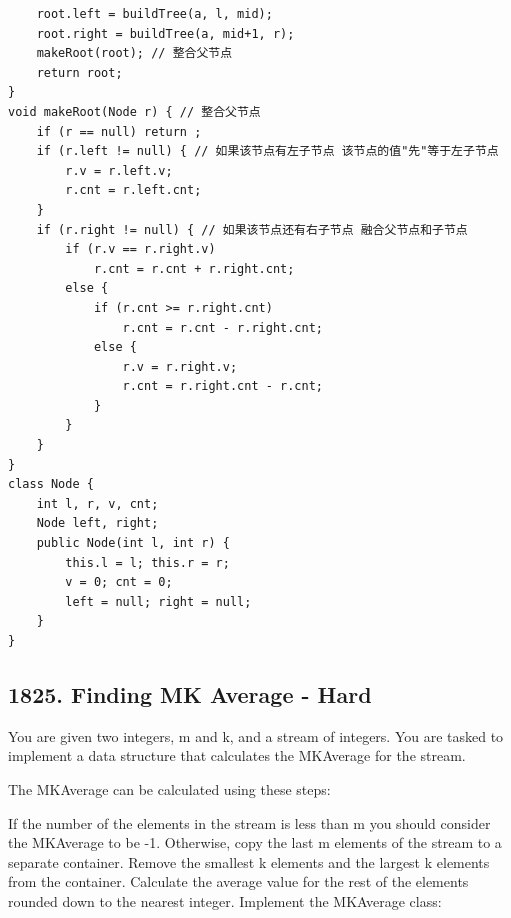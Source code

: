 \documentclass[9pt, b5paaper]{book}
\begin{document}
\begin{verbatim}
    root.left = buildTree(a, l, mid);
    root.right = buildTree(a, mid+1, r);
    makeRoot(root); // 整合父节点
    return root;
}
void makeRoot(Node r) { // 整合父节点
    if (r == null) return ;
    if (r.left != null) { // 如果该节点有左子节点 该节点的值"先"等于左子节点
        r.v = r.left.v;
        r.cnt = r.left.cnt;
    }
    if (r.right != null) { // 如果该节点还有右子节点 融合父节点和子节点
        if (r.v == r.right.v)
            r.cnt = r.cnt + r.right.cnt;
        else {
            if (r.cnt >= r.right.cnt)
                r.cnt = r.cnt - r.right.cnt;
            else {
                r.v = r.right.v;
                r.cnt = r.right.cnt - r.cnt;
            }
        }
    }
}
class Node {
    int l, r, v, cnt;
    Node left, right;
    public Node(int l, int r) {
        this.l = l; this.r = r;
        v = 0; cnt = 0;
        left = null; right = null;
    }
}
\end{verbatim}
\subsection{1825. Finding MK Average - Hard}
\label{sec-1-1-3}
You are given two integers, m and k, and a stream of integers. You are tasked to implement a data structure that calculates the MKAverage for the stream.

The MKAverage can be calculated using these steps:

If the number of the elements in the stream is less than m you should consider the MKAverage to be -1. Otherwise, copy the last m elements of the stream to a separate container.
Remove the smallest k elements and the largest k elements from the container.
Calculate the average value for the rest of the elements rounded down to the nearest integer.
Implement the MKAverage class:
\end{document}
